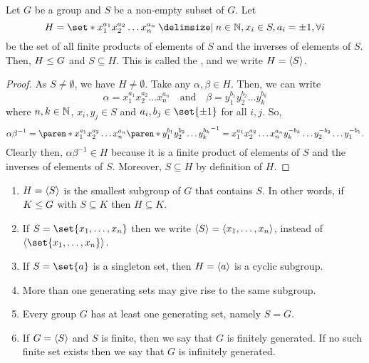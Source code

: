 \documentclass[11pt]{penrose}
\begin{document}
\begin{nthm}
    Let $G$ be a group and $S$ be a non-empty subset of $G$. Let
    \begin{equation*}
        H = \set*{ x_{1}^{a_{1}} x_{2}^{a_{2}} \dots x_{n}^{a_{n}} \st n \in \N, x_{i} \in S, a_{i} = \pm 1, \forall i}
    \end{equation*}
    be the set of all finite products of elements of $S$ and the inverses of elements of $S$. Then, $H \mathrel{\leq} G$ and $S \subseteq H$. This is called the , and we write $H = \langle S\rangle$.
\end{nthm}
\begin{proof}
    As $S \neq \emptyset$, we have $H \neq \emptyset$. Take any $\alpha, \beta \in H$. Then, we can write
    \begin{equation*}
        \alpha = x_{1}^{a_{1}} x_{2}^{a_{2}} \dots x_{n}^{a_{n}}
        \quad\text{and}\quad
        \beta = y_{1}^{b_{1}} y_{2}^{b_{2}} \dots y_{k}^{b_{k}}
    \end{equation*}
    where $n, k \in \mathbb{N}$, $x_{i}, y_{j} \in S$ and $a_{i}, b_{j} \in \set{\pm 1}$ for all $i, j$. So,
    \begin{equation*}
        \alpha \beta^{-1}
        = \paren*{ x_{1}^{a_{1}} x_{2}^{a_{2}} \dots x_{n}^{a_{n}} } \paren*{ y_{1}^{b_{1}} y_{2}^{b_{2}} \dots y_{k}^{b_{k}} }^{-1}
        = x_{1}^{a_{1}} x_{2}^{a_{2}} \dots x_{n}^{a_{n}} y_{k}^{-b_{k}} \dots y_{2}^{-b_{2}} \dots y_{1}^{-b_{1}}.
    \end{equation*}
    Clearly then, $\alpha\beta^{-1} \in H$ because it is a finite product of elements of $S$ and the inverses of elements of $S$. Moreover, $S \subseteq H$ by definition of $H$.
\end{proof}

\begin{remark}\phantom{}
    \begin{enumerate}
        \item $H = \langle S\rangle$ is the smallest subgroup of $G$ that contains $S$. In other words, if $K \mathrel{\leq} G$ with $S \subseteq K$ then $H \subseteq K$.
        \item If $S = \set{x_{1}, \dots, x_{n}}$ then we write $\langle S\rangle = \langle x_{1}, \dots, x_{n}\rangle$, instead of $\cyclic{\set{x_{1}, \dots, x_{n}}}$.
        \item If $S = \set{a}$ is a singleton set, then $H = \langle a\rangle$ is a cyclic subgroup.
        \item More than one generating sets may give rise to the same subgroup.
        \item Every group $G$ has at least one generating set, namely $S = G$.
        \item If $G = \langle S\rangle$ and $S$ is finite, then we say that $G$ is finitely generated. If no such finite set exists then we say that $G$ is infinitely generated.
    \end{enumerate}
\end{remark}
\end{document}
